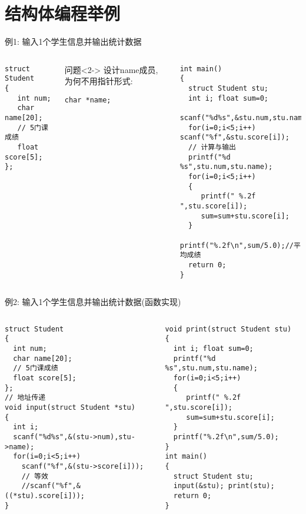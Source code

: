 \section{结构体编程举例}

\begin{frame}{例1: 输入1个学生信息并输出统计数据}
\vspace{-0.5cm}
\begin{columns}[T]
\begin{lstlisting}
struct Student 
{ 
   int num;
   char name[20];
   // 5门课成绩
   float score[5];
};
\end{lstlisting}
\begin{block}{问题}<2->
	设计name成员, 为何不用指针形式:
	
	\lstinline|char *name;| 
\end{block}
\begin{lstlisting}[frame=leftline]
int main()
{ 
  struct Student stu;
  int i; float sum=0;
  scanf("%d%s",&stu.num,stu.name);
  for(i=0;i<5;i++) scanf("%f",&stu.score[i]); 
  // 计算与输出
  printf("%d %s",stu.num,stu.name);
  for(i=0;i<5;i++)
  { 
     printf(" %.2f ",stu.score[i]);
     sum=sum+stu.score[i];
  }
  printf("%.2f\n",sum/5.0);//平均成绩 
  return 0;
}
\end{lstlisting}
\end{columns}
\medskip
\end{frame}


\begin{frame}{例2: 输入1个学生信息并输出统计数据(函数实现)}
\vspace{-0.5cm}
\begin{columns}[T]
\begin{lstlisting}
struct Student 
{ 
  int num;
  char name[20];
  // 5门课成绩
  float score[5];
};
// 地址传递
void input(struct Student *stu)
{
  int i;
  scanf("%d%s",&(stu->num),stu->name);
  for(i=0;i<5;i++) 
    scanf("%f",&(stu->score[i])); 
    // 等效
    //scanf("%f",&((*stu).score[i]));
}
\end{lstlisting}
\begin{lstlisting}[frame=leftline]
void print(struct Student stu)
{
  int i; float sum=0;
  printf("%d %s",stu.num,stu.name);
  for(i=0;i<5;i++)
  { 
     printf(" %.2f ",stu.score[i]);
     sum=sum+stu.score[i];
  }
  printf("%.2f\n",sum/5.0);
}
int main()
{ 
  struct Student stu;
  input(&stu); print(stu); 
  return 0;
}
\end{lstlisting}
\end{columns}
\medskip
\end{frame}

